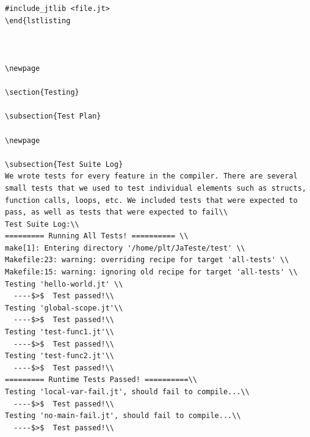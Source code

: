 \documentclass{article}
\begin{document}
\begin{lstlisting}
#include_jtlib <file.jt>
\end{lstlisting



\newpage

\section{Testing}

\subsection{Test Plan}

\newpage

\subsection{Test Suite Log}
We wrote tests for every feature in the compiler. There are several small tests that we used to test individual elements such as structs, function calls, loops, etc. We included tests that were expected to pass, as well as tests that were expected to fail\\
Test Suite Log:\\
========= Running All Tests! ========== \\
make[1]: Entering directory '/home/plt/JaTeste/test' \\
Makefile:23: warning: overriding recipe for target 'all-tests' \\
Makefile:15: warning: ignoring old recipe for target 'all-tests' \\
Testing 'hello-world.jt' \\
  ----$>$  Test passed!\\
Testing 'global-scope.jt'\\
  ----$>$  Test passed!\\
Testing 'test-func1.jt'\\
  ----$>$  Test passed!\\
Testing 'test-func2.jt'\\
  ----$>$  Test passed!\\
========= Runtime Tests Passed! ==========\\
Testing 'local-var-fail.jt', should fail to compile...\\
  ----$>$  Test passed!\\
Testing 'no-main-fail.jt', should fail to compile...\\
  ----$>$  Test passed!\\

\end{lstlisting}
\end{document}
